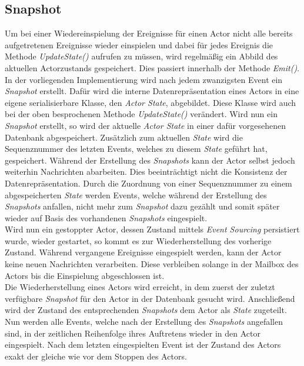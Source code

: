 \subsection{Snapshot}
\label{subsec:implementation:eventSouring:Snapshot}
Um bei einer Wiedereinspielung der Ereignisse für einen Actor nicht alle bereits aufgetretenen Ereignisse wieder einspielen und dabei für jedes Ereignis die Methode \textit{UpdateState()} aufrufen zu müssen, wird regelmäßig ein Abbild des aktuellen Actorzustands gespeichert. Dies passiert innerhalb der Methode \textit{Emit()}. In der vorliegenden Implementierung wird nach jedem zwanzigsten Event ein \textit{Snapshot} erstellt. Dafür wird die interne Datenrepräsentation eines Actors in eine eigene serialisierbare Klasse, den \textit{Actor State}, abgebildet. Diese Klasse wird auch bei der oben besprochenen Methode \textit{UpdateState()} verändert. Wird nun ein \textit{Snapshot} erstellt, so wird der aktuelle \textit{Actor State} in einer dafür vorgesehenen Datenbank abgespeichert. Zusätzlich zum aktuellen \textit{State} wird die Sequenznummer des letzten Events, welches zu diesem \textit{State} geführt hat, gespeichert. Während der Erstellung des \textit{Snapshots} kann der Actor selbst jedoch weiterhin Nachrichten abarbeiten. Dies beeinträchtigt nicht die Konsistenz der Datenrepräsentation. Durch die Zuordnung von einer Sequenznummer zu einem abgespeicherten \textit{State} werden Events, welche während der Erstellung des \textit{Snapshots} anfallen, nicht mehr zum \textit{Snapshot} dazu gezählt und somit später wieder auf Basis des vorhandenen \textit{Snapshots} eingespielt. \\
Wird nun ein gestoppter Actor, dessen Zustand mittels \textit{Event Sourcing} persistiert wurde, wieder gestartet, so kommt es zur Wiederherstellung des vorherige Zustand. Während vergangene Ereignisse eingespielt werden, kann der Actor keine neuen Nachrichten verarbeiten. Diese verbleiben solange in der Mailbox des Actors bis die Einspielung abgeschlossen ist. \\
Die Wiederherstellung eines Actors wird erreicht, in dem zuerst der zuletzt verfügbare \textit{Snapshot} für den Actor in der Datenbank gesucht wird. Anschließend wird der Zustand des entsprechenden \textit{Snapshots} dem Actor als \textit{State} zugeteilt. Nun werden alle Events, welche nach der Erstellung des \textit{Snapshots} angefallen sind, in der zeitlichen Reihenfolge ihres Auftretens wieder in den Actor eingespielt. Nach dem letzten eingespielten Event ist der Zustand des Actors exakt der gleiche wie vor dem Stoppen des Actors. \\

